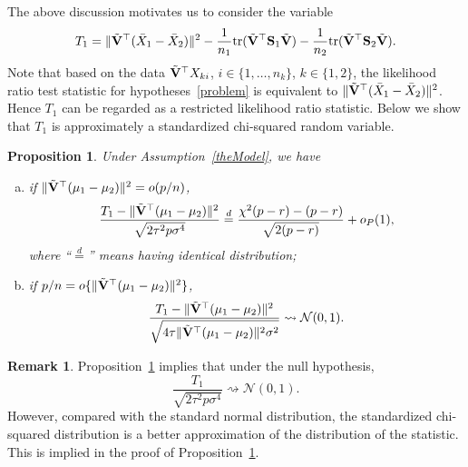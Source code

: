 \documentclass[times,sort&compress,3p]{elsarticle}
\newcommand{\mytr}{ {\rm tr} }
\theoremstyle{plain}
\newtheorem{proposition}{\quad\quad Proposition}
\theoremstyle{definition}
\newtheorem{remark}{\quad\quad Remark}
\theoremstyle{remark}
\begin{document}
The above discussion motivates us to consider the variable
\begin{align*}
    T_1=\|\tilde{\BV}^\top (\bar{X}_1-\bar{X}_2)\|^2-\frac{1}{n_1}\mytr(\tilde{\BV}^\top  \BS_1\tilde{\BV})-\frac{1}{n_2}\mytr(\tilde{\BV}^\top  \BS_2\tilde{\BV}).
    \\
\end{align*}
Note that based on the data $\tilde{\mathbf{V}}^\top  X_{ki}$, $i\in \{1,\ldots,n_k \}$, $k\in \{1,2\}$, the likelihood ratio test statistic for hypotheses~\eqref{problem} is equivalent to 
    $\|\tilde{\mathbf{V}}^\top  (\bar{X}_1-\bar{X}_2)\|^2$. 
Hence $T_1$ can be regarded as a restricted likelihood ratio statistic.
Below we show that $T_1$ is approximately a standardized chi-squared random variable.
\begin{proposition}\label{oracleTheorem}
    Under Assumption~\ref{theModel}, we have 
    \begin{enumerate}[(a)]
\item
    if $\|\tilde{\mathbf{V}}^\top (\mu_1-\mu_2)\|^2= o(p/n)$,
    \begin{equation}\label{oracleTheoremR1}
        \frac{T_1-\|\tilde{\mathbf{V}}^\top (\mu_1-\mu_2)\|^2}
        {\sqrt{2\tau^2 p\sigma^4}}
        \overset{d}{=} \frac{\chi^2(p-r)-(p-r)}{\sqrt{2(p-r)}}+o_P(1),
    \end{equation}
where ``$\overset{d}{=}$'' means having identical distribution;
\item
    if $p/n= o\{\|\tilde{\mathbf{V}}^\top (\mu_1-\mu_2)\|^2\}$, 
    \begin{equation}\label{oracleTheoremR2}
        \frac{T_1-\|\tilde{\mathbf{V}}^\top (\mu_1-\mu_2)\|^2}
        {\sqrt{4\tau\|\tilde{\mathbf{V}}^\top (\mu_1-\mu_2)\|^2\sigma^2}}\rightsquigarrow \mathcal{N}(0,1).
    \end{equation}
    \end{enumerate}
\end{proposition}
\begin{remark}
    Proposition~\ref{oracleTheorem} implies that under the null hypothesis,
    $$
        \frac{T_1}
        {\sqrt{2\tau^2 p\sigma^4}}\rightsquigarrow \mathcal{N}(0,1).
    $$
    However, compared with the standard normal distribution, the standardized chi-squared distribution is a better approximation of the distribution of the statistic.
    This is implied in the proof of Proposition~\ref{oracleTheorem}.
\end{remark}
\end{document}
